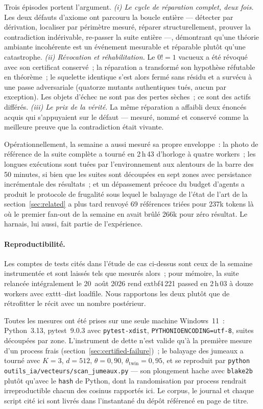 \documentclass[11pt]{article}
\theoremstyle{remark}\newtheorem{example}{Exemple}
\begin{document}
Trois épisodes portent l'argument. \emph{(i) Le cycle de réparation complet, deux
fois.} Les deux défauts d'axiome ont parcouru la boucle entière --- détecter par
dérivation, localiser par périmètre mesuré, réparer structurellement, prouver la
contradiction indérivable, re-passer la suite entière ---, démontrant qu'une théorie
ambiante incohérente est un événement mesurable et réparable plutôt qu'une catastrophe.
\emph{(ii) Révocation et réhabilitation.} Le $0! = 1$ vacueux a été révoqué avec son
certificat conservé~; la réparation a transformé son hypothèse réfutable en théorème~;
le squelette identique s'est alors fermé sans résidu et a survécu à une passe
adversariale (quatorze mutants authentiques tués, aucun par exception). Les objets
d'échec ne sont pas des pertes sèches~; ce sont des actifs différés. \emph{(iii) Le
prix de la vérité.} La même réparation a affaibli deux énoncés acquis qui s'appuyaient
sur le défaut --- mesuré, nommé et conservé comme la meilleure preuve que la
contradiction était vivante.

Opérationnellement, la semaine a aussi mesuré sa propre enveloppe~: la photo de
référence de la suite complète a tourné en 2\,h\,43 d'horloge à quatre workers~; les
longues exécutions sont tuées par l'environnement aux alentours de la barre des
50 minutes, si bien que les suites sont découpées en sept zones avec persistance
incrémentale des résultats~; et un dépassement précoce du budget d'agents a produit le
protocole de frugalité sous lequel le balayage de l'état de l'art de la
section~\ref{sec:related} a plus tard renvoyé 69 références triées pour 237k tokens là
où le premier fan-out de la semaine en avait brûlé 266k pour zéro résultat. Le harnais,
lui aussi, fait partie de l'expérience.

\paragraph{Reproductibilité.} Les comptes de tests cités dans l'étude de cas ci-dessus sont ceux de la semaine instrumentée et sont laissés tels que mesurés alors~; pour mémoire, la suite relancée intégralement le 20~août 2026 rend 	extbf{4\,221 passed en 2\,h\,03} à douze workers avec 	exttt{--dist loadfile}. Nous rapportons les deux plutôt que de rétrofitter le récit avec un nombre postérieur.

Toutes les mesures ont été prises sur une seule machine
Windows~11~: Python~3.13, pytest~9.0.3 avec \texttt{pytest-xdist},
\texttt{PYTHONIOENCODING=utf-8}, suites découpées par zone. L'instrument de dette n'est
valide qu'à la première mesure d'un process frais
(section~\ref{sec:certified-failure})~; le balayage des jumeaux a tourné avec $K = 3$,
$d = 512$, $\theta = 0{,}90$, $\theta_{\mathrm{twin}} = 0{,}95$, et se reproduit par
\texttt{python outils\_ia/vecteurs/scan\_jumeaux.py} --- son plongement hache avec
\texttt{blake2b} plutôt qu'avec le \texttt{hash} de Python, dont la randomisation par
process rendrait irreproductible chacun des cosinus rapportés ici. Le corpus, le
journal et chaque script cité ici sont livrés dans l'instantané du dépôt référencé
en page de titre.
\end{document}

